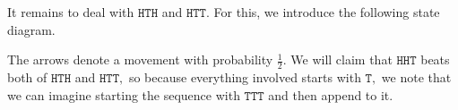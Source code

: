 It remains to deal with $\texttt{HTH}$ and $\texttt{HTT}.$ For this, we introduce the following state diagram.
\begin{center}
\end{center}
The arrows denote a movement with probability $\frac12.$ We will claim that $\texttt{HHT}$ beats both of $\texttt{HTH}$ and $\texttt{HTT},$ so because everything involved starts with $\texttt{T},$ we note that we can imagine starting the sequence with $\texttt{TTT}$ and then append to it.

